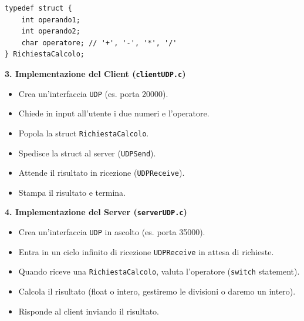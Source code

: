 \documentclass[11pt]{article}
\begin{document}
\begin{tcolorbox}[colback=green!5!white,colframe=green!75!black,title=\textbf{RISPOSTA}, breakable]
\begin{lstlisting}
typedef struct {
    int operando1;
    int operando2;
    char operatore; // '+', '-', '*', '/'
} RichiestaCalcolo;
\end{lstlisting}

\textbf{3. Implementazione del Client (\texttt{clientUDP.c})}
\begin{itemize}
    \item Crea un'interfaccia \texttt{UDP} (es. porta 20000).
    \item Chiede in input all'utente i due numeri e l'operatore.
    \item Popola la struct \texttt{RichiestaCalcolo}.
    \item Spedisce la struct al server (\texttt{UDPSend}).
    \item Attende il risultato in ricezione (\texttt{UDPReceive}).
    \item Stampa il risultato e termina.
\end{itemize}

\textbf{4. Implementazione del Server (\texttt{serverUDP.c})}
\begin{itemize}
    \item Crea un'interfaccia \texttt{UDP} in ascolto (es. porta 35000).
    \item Entra in un ciclo infinito di ricezione \texttt{UDPReceive} in attesa di richieste.
    \item Quando riceve una \texttt{RichiestaCalcolo}, valuta l'operatore (\texttt{switch} statement).
    \item Calcola il risultato (float o intero, gestiremo le divisioni o daremo un intero).
    \item Risponde al client inviando il risultato.
\end{itemize}
\end{tcolorbox}
\end{document}
